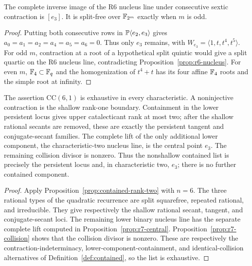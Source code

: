 \begin{proposition}\label{prop:r7-central}%
%
The complete inverse image of the R6 nucleus line under consecutive
sextic contraction is $[e_3]$.  It is split-free over $\mathbb F_{2^m}$
exactly when $m$ is odd.
\end{proposition}

\begin{proof}
Putting both consecutive rows in
$\mathbb P\langle e_2,e_3\rangle$ gives
$a_0=a_1=a_2=a_4=a_5=a_6=0$.  Thus only $e_3$ remains, with
$W_{e_3}=\langle1,t,t^4,t^5\rangle$.  For odd $m$, contraction at a
root of a hypothetical split quintic would give a split quartic on the
R6 nucleus line, contradicting Proposition~\ref{prop:r6-nucleus}.  For
even $m$, $\mathbb F_4\subset\mathbb F_q$ and the homogenization of $t^4+t$ has its
four affine $\mathbb F_4$ roots and the simple root at infinity.
\end{proof}

\begin{corollary}
\label{cor:r7-contained}%
%
The assertion $\mathrm{CC}(6,1)$ is exhaustive in every
characteristic.  A noninjective contraction is the shallow rank-one
boundary.  Containment in the lower persistent locus gives upper
catalecticant rank at most two; after the shallow rational secants are
removed, these are exactly the persistent tangent and conjugate-secant
families.  The complete lift of the only additional lower component,
the characteristic-two nucleus line, is the central point \(e_3\).
The remaining collision divisor is nonzero.  Thus the
nonshallow contained list is precisely the persistent locus and, in
characteristic two, \(e_3\); there is no further contained component.
\end{corollary}

\begin{proof}
Apply Proposition~\ref{prop:contained-rank-two} with $n=6$.  The three
rational types of the quadratic recurrence are split squarefree,
repeated rational, and irreducible.  They give respectively the shallow
rational secant, tangent, and conjugate-secant loci.  The remaining
lower binary nucleus line has the separate complete lift computed in
Proposition~\ref{prop:r7-central}.  Proposition~\ref{prop:r7-collision}
shows that the collision divisor is nonzero.  These are respectively
the contraction-indeterminacy, lower-component-containment, and
identical-collision alternatives of Definition~\ref{def:contained},
so the list is exhaustive.
\end{proof}

